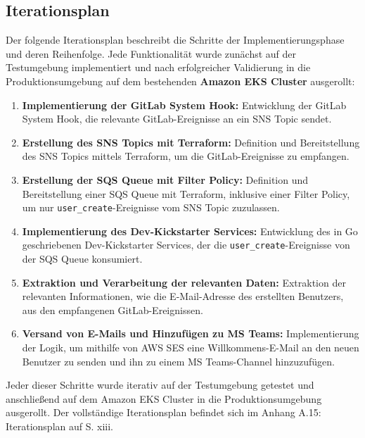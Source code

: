 \subsection{Iterationsplan}
\label{app:Iterationsplan}

Der folgende Iterationsplan beschreibt die Schritte der Implementierungsphase und deren Reihenfolge. Jede Funktionalität wurde zunächst auf der Testumgebung implementiert und nach erfolgreicher Validierung in die Produktionsumgebung auf dem bestehenden \textbf{Amazon EKS Cluster} ausgerollt:

\begin{enumerate}
    \item \textbf{Implementierung der GitLab System Hook:} Entwicklung der GitLab System Hook, die relevante GitLab-Ereignisse an ein SNS Topic sendet.
    
    \item \textbf{Erstellung des SNS Topics mit Terraform:} Definition und Bereitstellung des SNS Topics mittels Terraform, um die GitLab-Ereignisse zu empfangen.
    
    \item \textbf{Erstellung der SQS Queue mit Filter Policy:} Definition und Bereitstellung einer SQS Queue mit Terraform, inklusive einer Filter Policy, um nur \texttt{user\_create}-Ereignisse vom SNS Topic zuzulassen.
    
    \item \textbf{Implementierung des Dev-Kickstarter Services:} Entwicklung des in Go geschriebenen Dev-Kickstarter Services, der die \texttt{user\_create}-Ereignisse von der SQS Queue konsumiert.
    
    \item \textbf{Extraktion und Verarbeitung der relevanten Daten:} Extraktion der relevanten Informationen, wie die E-Mail-Adresse des erstellten Benutzers, aus den empfangenen GitLab-Ereignissen.
    
    \item \textbf{Versand von E-Mails und Hinzufügen zu MS Teams:} Implementierung der Logik, um mithilfe von AWS SES eine Willkommens-E-Mail an den neuen Benutzer zu senden und ihn zu einem MS Teams-Channel hinzuzufügen.
\end{enumerate}

Jeder dieser Schritte wurde iterativ auf der Testumgebung getestet und anschließend auf dem Amazon EKS Cluster in die Produktionsumgebung ausgerollt. Der vollständige Iterationsplan befindet sich im Anhang A.15: Iterationsplan auf S. xiii.

